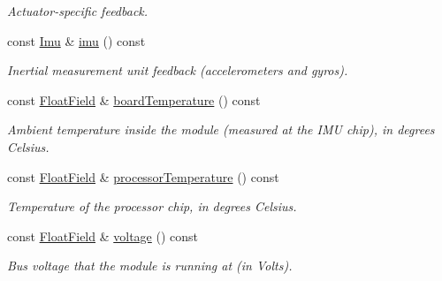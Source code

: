 \begin{DoxyCompactItemize}
\begin{DoxyCompactList}\small\item\em Actuator-\/specific feedback. \end{DoxyCompactList}\item 
\mbox{\label{classhebi_1_1Feedback_ab77ec717833f35129612bad013820eec}} 
const \hyperlink{classhebi_1_1Feedback_1_1Imu}{Imu} \& \hyperlink{classhebi_1_1Feedback_ab77ec717833f35129612bad013820eec}{imu} () const
\begin{DoxyCompactList}\small\item\em Inertial measurement unit feedback (accelerometers and gyros). \end{DoxyCompactList}\item 
\mbox{\label{classhebi_1_1Feedback_a4a7913a54d9de912d9597428b6d80859}} 
const \hyperlink{classhebi_1_1Feedback_1_1FloatField}{Float\+Field} \& \hyperlink{classhebi_1_1Feedback_a4a7913a54d9de912d9597428b6d80859}{board\+Temperature} () const
\begin{DoxyCompactList}\small\item\em Ambient temperature inside the module (measured at the I\+MU chip), in degrees Celsius. \end{DoxyCompactList}\item 
\mbox{\label{classhebi_1_1Feedback_ae2e6fb0fe8593610a6e122a29269e540}} 
const \hyperlink{classhebi_1_1Feedback_1_1FloatField}{Float\+Field} \& \hyperlink{classhebi_1_1Feedback_ae2e6fb0fe8593610a6e122a29269e540}{processor\+Temperature} () const
\begin{DoxyCompactList}\small\item\em Temperature of the processor chip, in degrees Celsius. \end{DoxyCompactList}\item 
\mbox{\label{classhebi_1_1Feedback_a5c3047aae6938fe45390ab1042115a07}} 
const \hyperlink{classhebi_1_1Feedback_1_1FloatField}{Float\+Field} \& \hyperlink{classhebi_1_1Feedback_a5c3047aae6938fe45390ab1042115a07}{voltage} () const
\begin{DoxyCompactList}\small\item\em Bus voltage that the module is running at (in Volts). \end{DoxyCompactList}\item 

\end{DoxyCompactItemize}
